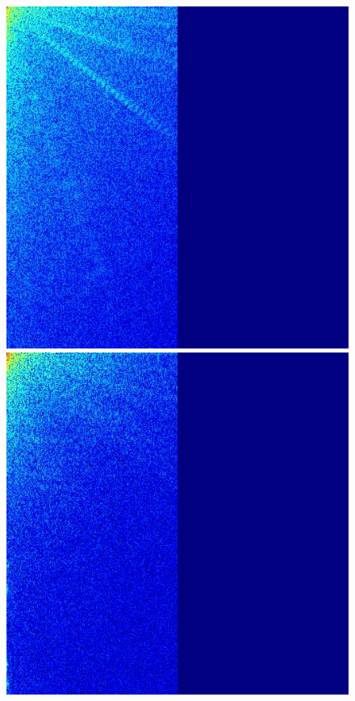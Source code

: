 \documentclass[12pt]{report}
\begin{document}
\begin{figure}[H]
\begin{center}
\includegraphics[scale=0.25]{../ImageRes/dct_masked1_0.jpg} 
\includegraphics[scale=0.25]{../ImageRes/dct_masked1_1.jpg} 

\end{center}
\end{figure}
\end{document}
